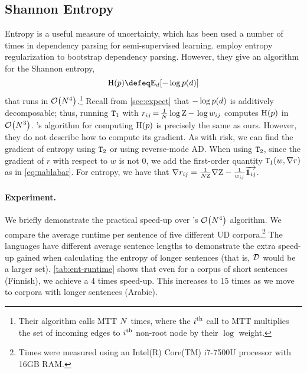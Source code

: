 \documentclass[11pt,a4paper]{article}
\theoremstyle{definition}
\begin{document}
\subsection{Shannon Entropy}\label{sec:ent}
Entropy is a useful measure of uncertainty, which has been used a number of times in dependency parsing \citep{smith-eisner-2007,druck09covariance, ma-xia-2014-unsupervised} for semi-supervised learning.
\citet{smith-eisner-2007} employ entropy regularization \cite{grandvalet-bengio-2005}
to bootstrap dependency parsing.
However, they give an algorithm for the Shannon entropy,
\begin{equation}\label{eq:ent}
    \ent(\prob) \defeq \expect{d}{- \log\ptree{\tree}}
\end{equation}
that runs in $\mathcal{O}\!\left({N}^4\right)$.\footnote{Their algorithm calls MTT ${N}$ times, where the $i^{\text{th}}$ call to MTT multiplies the set of incoming edges to $i^{\text{th}}$ non-root node by their $\log$ weight.}
Recall from \cref{sec:expect} that $-\log{p({d})}$ is additively decomposable;  
thus, 
running $\texttt{T}_1$ with ${r_{ij}} \,{=}\, \frac{1}{{N}}\log{\mathrm{Z}}\,{-}\,\log{w_{ij}}$
computes $\mathrm{H}(p)$ in $\mathcal{O}\!\left({N}^3\right)$. \citet{martins-etal-2010-turbo}'s algorithm for computing $\mathrm{H}(p)$ is precisely the same as ours.  However, they do not describe how to compute its gradient.
As with risk, we can find the gradient of entropy using $\texttt{T}_2$ or using reverse-mode AD.
When using $\texttt{T}_2$, since the gradient of $r$ with respect to $w$ is not $0$, we add the first-order quantity $\texttt{T}_1\!\left( w, \nabla r \right)$ as in \cref{eq:nablabar}.
For entropy, we have that $\nabla{r_{ij}}=\frac{1}{{N}{\mathrm{Z}}}\nabla{\mathrm{Z}}-\frac{1}{{w_{ij}}}{\overrightarrow{\boldsymbol{1}_{ij}}}$.

\paragraph{Experiment.} We briefly demonstrate the practical speed-up over \citet{smith-eisner-2007}'s $\mathcal{O}\!\left({N}^4\right)$ algorithm.
We compare the average runtime per sentence of five different UD corpora.\footnote{Times were measured using an Intel(R) Core(TM) i7-7500U processor with 16GB RAM.}
The languages have different average sentence lengths to demonstrate the extra speed-up gained when calculating the entropy of longer sentences (that is, ${\mathcal{D}}$ would be a larger set).
\cref{tab:ent-runtime} shows that even for a corpus of short sentences (Finnish), we achieve a $4$ times speed-up.
This increases to $15$ times as we move to corpora with longer sentences (Arabic).
\end{document}
